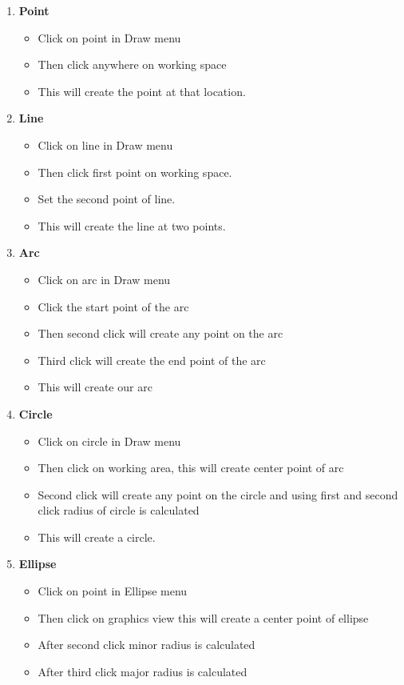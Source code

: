 \begin{enumerate}
\item \textbf{Point}
\begin{itemize}
\item Click on point in Draw menu
\item Then click anywhere on working space
\item This will create the point at that location.
\end{itemize}
\item \textbf{Line}
\begin{itemize}
\item Click on line in Draw menu
\item Then click first point on working space.
\item Set the second point of line.
\item This will create the line at two points.
\end{itemize}
\item \textbf{Arc}
\begin{itemize}
\item Click on arc in Draw menu
\item Click the start point of the arc
\item Then second click will create any point on the arc
\item Third click will create the end point of the arc
\item This will create our arc
\end{itemize}
\item \textbf{Circle}
\begin{itemize}
\item Click on circle in Draw menu
\item Then click on working area, this will create center point of arc
\item Second click will create any point on the circle and using first and second click radius of circle is calculated
\item This will create a circle.
\end{itemize}
\item \textbf{Ellipse}
\begin{itemize}
\item Click on point in Ellipse menu
\item Then click on graphics view this will create a center point of ellipse
\item After second click minor radius is calculated
\item After third click major radius is calculated

\end{itemize}
\end{enumerate}
